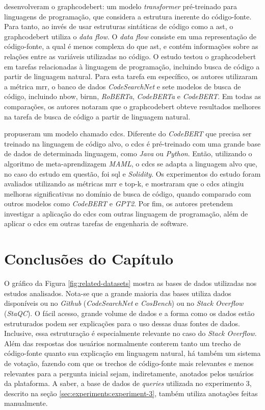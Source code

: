 \textcite{Guo2021GraphCodeBERTPC} desenvolveram o \gls{graphcodebert}: um modelo \textit{transformer} pré-treinado para linguagens de programação, que considera a estrutura inerente do código-fonte. Para tanto, ao invés de usar estruturas sintáticas de código como a \gls{ast}, o \gls{graphcodebert} utiliza o \textit{data flow}. O \textit{data flow} consiste em uma representação de código-fonte, a qual é menos complexa do que \gls{ast}, e contém informações sobre as relações entre as variáveis utilizadas no código. O estudo testou o \gls{graphcodebert} em tarefas relacionadas à linguagem de programação, incluindo busca de código a partir de linguagem natural. Para esta tarefa em específico, os autores utilizaram a métrica \gls{mrr}, o banco de dados \textit{CodeSearchNet} \cite{Husain2019CodeSearchNetCE} e sete modelos de busca de código, incluindo \gls{nbow}, \gls{birnn}, \textit{RoBERTa}, \textit{CodeBERTa} e \textit{CodeBERT}. Em todas as comparações, os autores notaram que o \gls{graphcodebert} obteve resultados melhores na tarefa de busca de código a partir de linguagem natural.

\textcite{Chai2022CrossDomainDC} propuseram um modelo chamado \gls{cdcs}. Diferente do \textit{CodeBERT} que precisa ser treinado na linguagem de código alvo, o \gls{cdcs} é pré-treinado com uma grande base de dados de determinada linguagem, como \textit{Java} ou \textit{Python}. Então, utilizando o algoritmo de meta-aprendizagem \textit{MAML}, o \gls{cdcs} se adapta a linguagem alvo que, no caso do estudo em questão, foi \gls{sql} e \textit{Solidity}. Os experimentos do estudo foram avaliados utilizando as métricas \gls{mrr} e top-k, e mostraram que o \gls{cdcs} atingiu melhoras significativas no domínio de busca de código, quando comparado com outros modelos como \textit{CodeBERT} e \textit{GPT2}. Por fim, os autores pretendem investigar a aplicação do \gls{cdcs} com outras linguagem de programação, além de aplicar o \gls{cdcs} em outras tarefas de engenharia de software.

\section{Conclusões do Capítulo}
\label{chp:relatedWorks:sec:conclusion}
O gráfico da Figura \ref{fig:related-datasets} mostra as bases de dados utilizadas nos estudos analisados. Nota-se que a grande maioria das bases utiliza dados disponíveis ou no \textit{Github} (\textit{CodeSearchNet} e \textit{CosBench}) ou no \textit{Stack Overflow} (\textit{StaQC}). O fácil acesso, grande volume de dados e a forma como os dados estão estruturados podem ser explicações para o uso dessas duas fontes de dados. Inclusive, essa estruturação é especialmente relevante no caso do \textit{Stack Overflow}. Além das respostas dos usuários normalmente conterem tanto um trecho de código-fonte quanto sua explicação em linguagem natural, há também um sistema de votação, fazendo com que os trechos de código-fonte mais relevantes e menos relevantes para a pergunta inicial sejam, indiretamente, anotados pelos usuários da plataforma. A saber, a base de dados de \textit{queries} utilizada no experimento 3, descrito na seção \ref{sec:experiments:experiment-3}, também utiliza anotações feitas manualmente.


